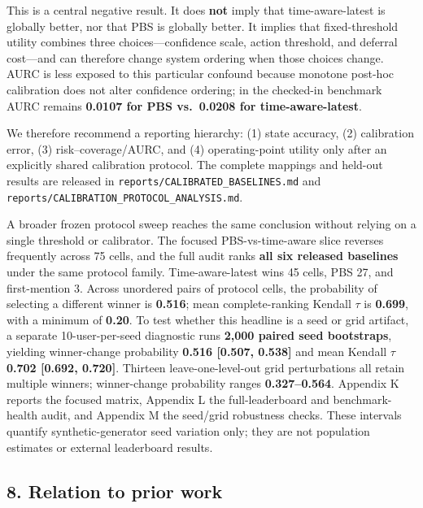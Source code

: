 This is a central negative result. It does \textbf{not} imply that
time-aware-latest is globally better, nor that PBS is globally better.
It implies that fixed-threshold utility combines three
choices---confidence scale, action threshold, and deferral cost---and
can therefore change system ordering when those choices change. AURC is
less exposed to this particular confound because monotone post-hoc
calibration does not alter confidence ordering; in the checked-in
benchmark AURC remains \textbf{0.0107 for PBS vs.~0.0208 for
time-aware-latest}.

We therefore recommend a reporting hierarchy: (1) state accuracy, (2)
calibration error, (3) risk--coverage/AURC, and (4) operating-point
utility only after an explicitly shared calibration protocol. The
complete mappings and held-out results are released in
\texttt{reports/CALIBRATED\_BASELINES.md} and
\texttt{reports/CALIBRATION\_PROTOCOL\_ANALYSIS.md}.

A broader frozen protocol sweep reaches the same conclusion without
relying on a single threshold or calibrator. The focused
PBS-vs-time-aware slice reverses frequently across 75 cells, and the
full audit ranks \textbf{all six released baselines} under the same
protocol family. Time-aware-latest wins 45 cells, PBS 27, and
first-mention 3. Across unordered pairs of protocol cells, the
probability of selecting a different winner is \textbf{0.516}; mean
complete-ranking Kendall \(\tau\) is \textbf{0.699}, with a minimum of
\textbf{0.20}. To test whether this headline is a seed or grid artifact,
a separate 10-user-per-seed diagnostic runs \textbf{2,000 paired seed
bootstraps}, yielding winner-change probability \textbf{0.516 {[}0.507,
0.538{]}} and mean Kendall \(\tau\) \textbf{0.702 {[}0.692, 0.720{]}}.
Thirteen leave-one-level-out grid perturbations all retain multiple
winners; winner-change probability ranges \textbf{0.327--0.564}.
Appendix K reports the focused matrix, Appendix L the full-leaderboard
and benchmark-health audit, and Appendix M the seed/grid robustness
checks. These intervals quantify synthetic-generator seed variation
only; they are not population estimates or external leaderboard results.

\subsection{8. Relation to prior work}\label{relation-to-prior-work}


